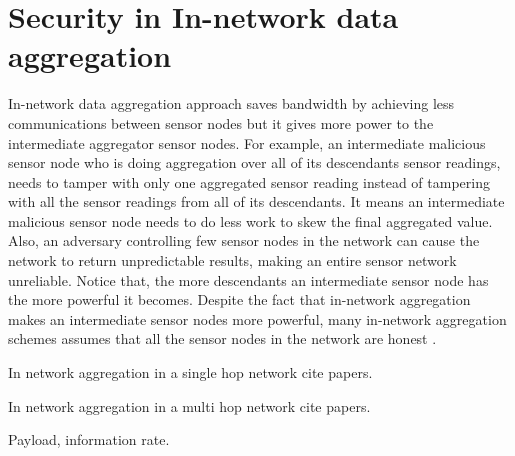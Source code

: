 \section{Security in In-network data aggregation}
	In-network data aggregation approach saves bandwidth by achieving less communications between sensor nodes but it gives more power to the intermediate aggregator sensor nodes. 
	For example, an intermediate malicious sensor node who is doing aggregation over all of its descendants sensor readings, needs to tamper with only one aggregated sensor reading instead of tampering with all the sensor readings from all of its descendants. 
	It means an intermediate malicious sensor node needs to do less work to skew the final aggregated value.
	Also, an adversary controlling few sensor nodes in the network can cause the network to return unpredictable results, making an entire sensor network unreliable.
	Notice that, the more descendants an intermediate sensor node has the more powerful it becomes.
	Despite the fact that in-network aggregation makes an intermediate sensor nodes more powerful, many in-network aggregation schemes assumes that all the sensor nodes in the network are honest \cite{yao2002cougar, madden2003design}.

In network aggregation in a single hop network cite papers.

In network aggregation in a  multi hop network cite papers.

Payload, information rate.

